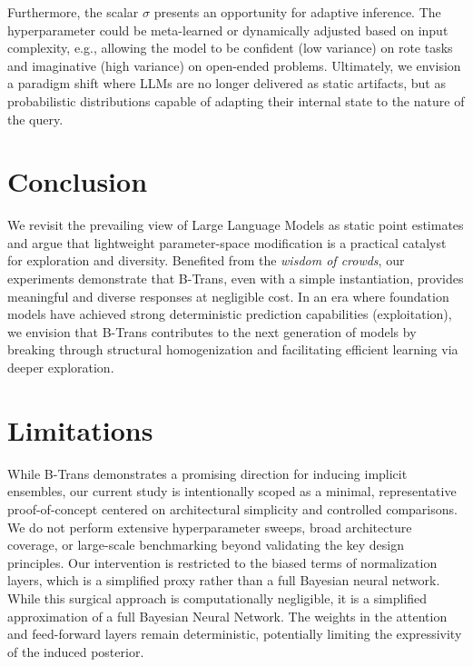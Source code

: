 \documentclass[11pt]{article}
\begin{document}
Furthermore, the scalar $\sigma$ presents an opportunity for adaptive inference. The hyperparameter could be meta-learned or dynamically adjusted based on input complexity, e.g., allowing the model to be confident (low variance) on rote tasks and imaginative (high variance) on open-ended problems. Ultimately, we envision a paradigm shift where LLMs are no longer delivered as static artifacts, but as probabilistic distributions capable of adapting their internal state to the nature of the query.


\section{Conclusion}
\label{sec:conclusion}

We revisit the prevailing view of Large Language Models as static point estimates and argue that lightweight parameter-space modification is a practical catalyst for exploration and diversity. Benefited from the \textit{wisdom of crowds}, our experiments demonstrate that B-Trans, even with a simple instantiation, provides meaningful and diverse responses at negligible cost. In an era where foundation models have achieved strong deterministic prediction capabilities (exploitation), we envision that B-Trans contributes to the next generation of models by breaking through structural homogenization and facilitating efficient learning via deeper exploration.




\clearpage

\section*{Limitations}
While B-Trans demonstrates a promising direction for inducing implicit ensembles, our current study is intentionally scoped as a minimal, representative proof-of-concept centered on architectural simplicity and controlled comparisons.
We do not perform extensive hyperparameter sweeps, broad architecture coverage, or large-scale benchmarking beyond validating the key design principles.
Our intervention is restricted to the biased terms of normalization layers, which is a simplified proxy rather than a full Bayesian neural network.
While this surgical approach is computationally negligible, it is a simplified approximation of a full Bayesian Neural Network. The weights in the attention and feed-forward layers remain deterministic, potentially limiting the expressivity of the induced posterior.
\end{document}
